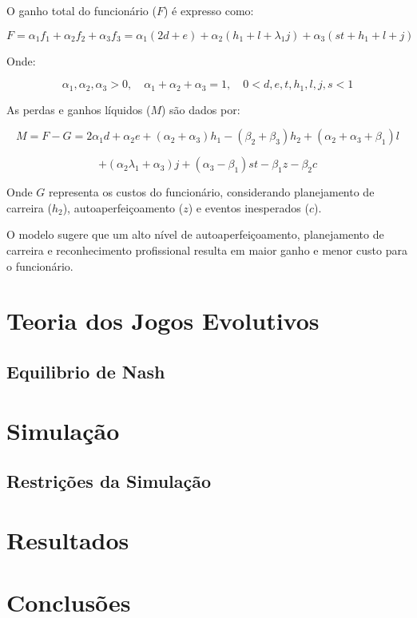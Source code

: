 \documentclass[
	article,			%
	11pt,				%
	oneside,			%
	a4paper,			%
	english,			%
	brazil,				%
	sumario=tradicional
	]{abntex2}
\begin{document}
O ganho total do funcionário (\( F \)) é expresso como:

\begin{equation}
    F = \alpha_1 f_1 + \alpha_2 f_2 + \alpha_3 f_3 = \alpha_1 (2d + e) + \alpha_2 (h_1 + l + \lambda_1 j) + \alpha_3 (st + h_1 + l + j)
\end{equation}

Onde:

\begin{equation}
    \alpha_1, \alpha_2, \alpha_3 > 0, \quad \alpha_1 + \alpha_2 + \alpha_3 = 1, \quad 0 < d, e, t, h_1, l, j, s < 1
\end{equation}

As perdas e ganhos líquidos (\( M \)) são dados por:

\begin{equation}
    M = F - G = 2\alpha_1 d + \alpha_2 e + (\alpha_2 + \alpha_3) h_1 - (\beta_2 + \beta_3) h_2 + (\alpha_2 + \alpha_3 + \beta_1) l 
\end{equation}

\begin{equation}
    + (\alpha_2 \lambda_1 + \alpha_3) j + (\alpha_3 - \beta_1) st - \beta_1 z - \beta_2 c
\end{equation}

Onde \( G \) representa os custos do funcionário, considerando planejamento de carreira (\( h_2 \)), autoaperfeiçoamento (\( z \)) e eventos inesperados (\( c \)).

O modelo sugere que um alto nível de autoaperfeiçoamento, planejamento de carreira e reconhecimento profissional resulta em maior ganho e menor custo para o funcionário.


\section{Teoria dos Jogos Evolutivos}

\subsection{Equilibrio de Nash}

\section{Simulação}

\subsection{Restrições da Simulação}

\section{Resultados}

\section{Conclusões}
\end{document}

